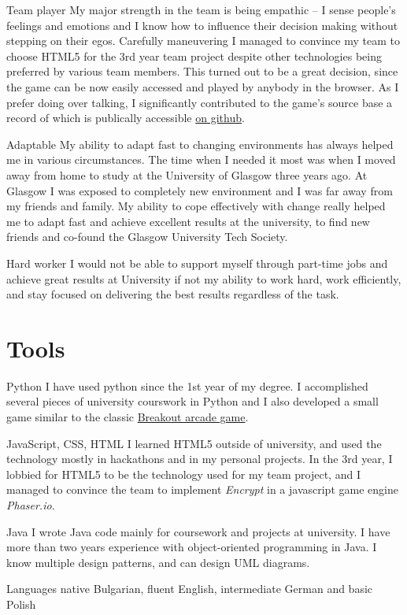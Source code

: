 \documentclass{tccv}
\begin{document}
\begin{skillist}
\item{Team player} {My major strength in the team is being empathic -- I sense people's feelings and emotions and I know how to influence their decision making without stepping on their egos. Carefully maneuvering I managed to convince my team to choose HTML5 for the 3rd year team project despite other technologies being preferred by various team members. This turned out to be a great decision, since the game can be now easily accessed and played by anybody in the browser. As I prefer doing over talking, I significantly contributed to the game's source base a record of which is publically accessible \href{https://github.com/ivababukova/TP3-Security-game}{on github}.}

\item{Adaptable} {My ability to adapt fast to changing environments has always helped me in various circumstances. The time when I needed it most was when I moved away from home to study at the University of Glasgow three years ago. At Glasgow I was exposed to completely new environment and I was far away from my friends and family. My ability to cope effectively with change really helped me to adapt fast and achieve excellent results at the university, to find new friends and co-found the Glasgow University Tech Society.}

\item{Hard worker} {I would not be able to support myself through part-time jobs and achieve great results at University if not my ability to work hard, work efficiently, and stay focused on delivering the best results regardless of the task.}

\end{skillist}
\newpage
\section{Tools}

\begin{skillist}

\item{Python} {I have used python since the 1st year of my degree. I accomplished several pieces of university courswork in Python and I also developed a small game similar to the classic \href{http://en.wikipedia.org/wiki/Breakout_(video_game)}{Breakout arcade game}.}

\item{JavaScript, CSS, HTML} {I learned HTML5 outside of university, and used the technology mostly in hackathons and in my personal projects. In the 3rd year, I lobbied for HTML5 to be the technology used for my team project, and I managed to convince the team to implement \textit{Encrypt} in a javascript game engine \textit{Phaser.io}.}

\item{Java}
{I wrote Java code mainly for coursework and projects at university. I have more than two years experience with object-oriented programming in Java. I know multiple design patterns, and can design UML diagrams.}
 
\item {Languages } {native Bulgarian, fluent English, intermediate German and basic Polish}
\end{skillist}
\end{document}
